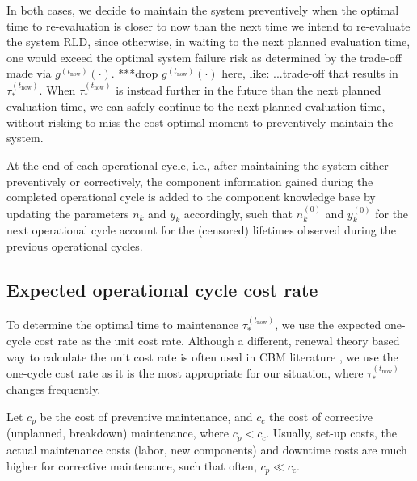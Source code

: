 \documentclass[authoryear]{elsarticle}
\newcommand{\uz}{^{(0)}} %
\def\ykz{y\uz_k}
\def\nkz{n\uz_k}
\newcommand{\nk}{n_k}
\newcommand{\yk}{y_k}
\def\tnow{t_\text{now}}
\newcommand{\gnow}{g^{(\tnow)}}
\newcommand{\tausnow}{\tau_*^{(\tnow)}}
\begin{document}
In both cases, we decide to maintain the system preventively
when the optimal time to re-evaluation is closer to now than the next time we intend to re-evaluate the system RLD, %
since otherwise, in waiting to the next planned evaluation time,
one would exceed the optimal system failure risk 
as determined by the trade-off made via $\gnow(\cdot)$. ***drop $\gnow(\cdot)$ here, like: ...trade-off that results in $\tausnow$.
When $\tausnow$ is instead further in the future than the next planned evaluation time,
we can safely continue to the next planned evaluation time,
without risking to miss the cost-optimal moment to preventively maintain the system.

At the end of each operational cycle, i.e.,
after maintaining the system either preventively or correctively,
the component information gained during the completed operational cycle is added to the component knowledge base
by updating the parameters $\nk$ and $\yk$ accordingly,
such that $\nkz$ and $\ykz$ for the next operational cycle
account for the (censored) lifetimes observed during the previous operational cycles.

%


\subsection{Expected operational cycle cost rate}
\label{sec:costrate}

To determine the optimal time to maintenance $\tausnow$,
we use the expected one-cycle cost rate 
\citep{1984:ansell-bendell-humble,1996:mazzuchi-soyer,2006:coolen-schrijner-coolen}
as the unit cost rate.
Although a different, renewal theory based way to calculate the unit cost rate is often used
in CBM literature \citep[e.g.,][]{2013:si-et-al,2011:kim-et-al},
we use the one-cycle cost rate as it is the most appropriate for our situation,
where $\tausnow$ changes frequently.

Let $c_p$ be the cost of preventive maintenance, and $c_c$ the cost of corrective (unplanned, breakdown) maintenance, where $c_p < c_c$.
Usually, set-up costs, the actual maintenance costs (labor, new components) and downtime costs are much higher for corrective maintenance,
such that often, $c_p \ll c_c$.
\end{document}
